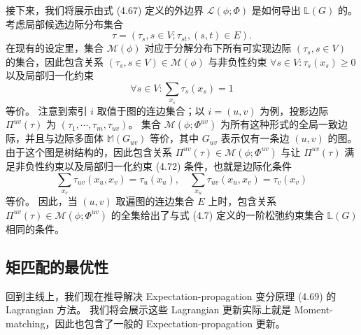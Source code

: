 \begin{tcolorbox}
\begin{exam}
接下来，我们将展示由式 (4.67) 定义的外边界 $\mathcal{L}(\phi; \Phi)$ 是如何导出 $\mathbb{L}(G)$ 的。
考虑局部候选边际分布集合
\begin{equation*}
    \tau = (\tau_s, s \in V; \tau_{st}, (s, t) \in E).
\end{equation*}
在现有的设定里，集合 $\mathcal{M}(\phi)$ 对应于分解分布下所有可实现边际 $(\tau_s, s \in V)$ 的集合，因此包含关系 $(\tau_s, s \in V) \in \mathcal{M}(\phi)$ 与非负性约束 $\forall s \in V: \tau_s(x_s) \geq 0$ 以及局部归一化约束
\begin{equation}
    \forall s \in V: \sum_{x_s}\tau_s(x_s) = 1
\end{equation}
等价。
注意到索引 $i$ 取值于图的连边集合；以 $i = (u, v)$ 为例，投影边际 $\Pi^{uv}(\tau)$ 为 $(\tau_1, \cdots, \tau_m, \tau_{uv})$。
集合 $\mathcal{M}(\phi; \Phi^{uv})$ 为所有这种形式的全局一致边际，并且与边际多面体 $\mathbb{M}(G_{uv})$ 等价，其中 $G_{uv}$ 表示仅有一条边 $(u, v)$ 的图。
由于这个图是树结构的，因此包含关系 $\Pi^{uv}(\tau) \in \mathcal{M}(\phi; \Phi^{uv})$ 与让 $\Pi^{uv}(\tau)$ 满足非负性约束以及局部归一化约束 (4.72) 条件，也就是边际化条件
\begin{equation*}
    \sum_{x_v}\tau_{uv}(x_u, x_v) = \tau_u(x_u), \quad \sum_{x_u}\tau_{uv}(x_u, x_v) = \tau_v(x_v)
\end{equation*}
等价。
因此，当 $(u, v)$ 取遍图的连边集合 $E$ 上时，包含关系 $\Pi^{uv}(\tau) \in \mathcal{M}(\phi; \Phi^{uv})$ 的全集给出了与式 (4.7) 定义的一阶松弛约束集合 $\mathbb{L}(G)$ 相同的条件。

\end{exam}
\end{tcolorbox}

\subsection{矩匹配的最优性}

回到主线上，我们现在推导解决 Expectation-propagation 变分原理 (4.69) 的 Lagrangian 方法。
我们将会展示这些 Lagrangian 更新实际上就是 Moment-matching，因此也包含了一般的 Expectation-propagation 更新。

